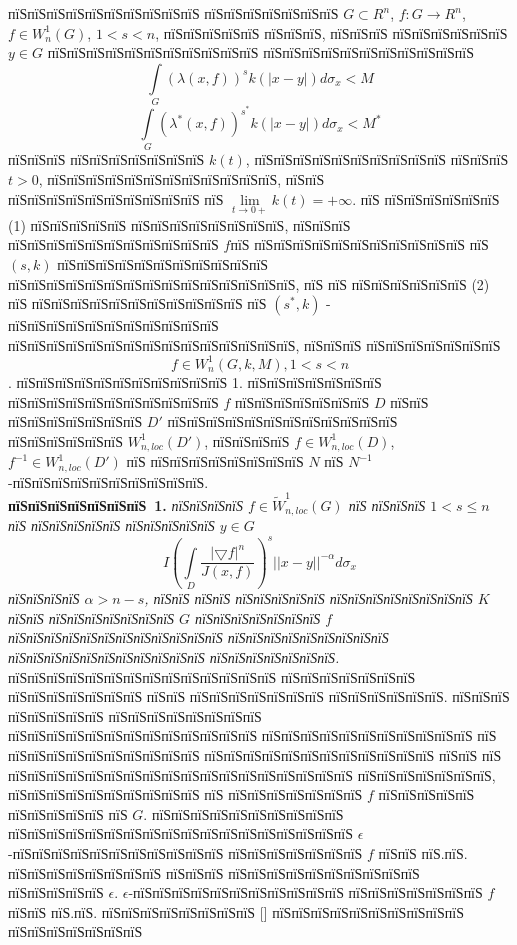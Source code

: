 \documentclass[a5paper, 12pt, openbib]{report}
\begin{document}
пїЅпїЅпїЅпїЅпїЅпїЅпїЅпїЅпїЅпїЅ  пїЅпїЅпїЅпїЅпїЅпїЅпїЅ $G\subset R^n$, $f:G\to R^n$, $f\in W^{1}_{n}(G)$, $1<s<n$, пїЅпїЅпїЅпїЅпїЅ пїЅпїЅпїЅ, пїЅпїЅпїЅ пїЅпїЅпїЅпїЅпїЅпїЅ $y\in G$ пїЅпїЅпїЅпїЅпїЅпїЅпїЅпїЅпїЅпїЅпїЅ пїЅпїЅпїЅпїЅпїЅпїЅпїЅпїЅпїЅпїЅпїЅ
\begin{equation}
\int\limits_{G}(\lambda(x,f))^{s}k(|x-y|)d\sigma_{x}<M
\end{equation} 
\begin{equation}
\int\limits_{G}(\lambda^{*}(x,f))^{s^{*}}k(|x-y|)d\sigma_{x}<M^{*}
\end{equation} 
пїЅпїЅпїЅ пїЅпїЅпїЅпїЅпїЅпїЅпїЅ $k(t)$, пїЅпїЅпїЅпїЅпїЅпїЅпїЅпїЅпїЅпїЅ пїЅпїЅпїЅ $t>0$, пїЅпїЅпїЅпїЅпїЅпїЅпїЅпїЅпїЅпїЅпїЅпїЅ, пїЅпїЅ пїЅпїЅпїЅпїЅпїЅпїЅпїЅпїЅпїЅпїЅ пїЅ $\lim\limits_{t\to 0+}k(t)=+\infty$. пїЅ  пїЅпїЅпїЅпїЅпїЅпїЅ (1) пїЅпїЅпїЅпїЅпїЅ пїЅпїЅпїЅпїЅпїЅпїЅпїЅпїЅ, пїЅпїЅпїЅ пїЅпїЅпїЅпїЅпїЅпїЅпїЅпїЅпїЅпїЅпїЅ $f$пїЅ пїЅпїЅпїЅпїЅпїЅпїЅпїЅпїЅпїЅпїЅпїЅ пїЅ $(s,k)$ пїЅпїЅпїЅпїЅпїЅпїЅпїЅпїЅпїЅпїЅпїЅ пїЅпїЅпїЅпїЅпїЅпїЅпїЅпїЅпїЅпїЅпїЅпїЅпїЅпїЅпїЅ, пїЅ пїЅ пїЅпїЅпїЅпїЅпїЅпїЅ (2) пїЅ пїЅпїЅпїЅпїЅпїЅпїЅпїЅпїЅпїЅпїЅпїЅ пїЅ $(s^{*},k)$ - пїЅпїЅпїЅпїЅпїЅпїЅпїЅпїЅпїЅпїЅпїЅ пїЅпїЅпїЅпїЅпїЅпїЅпїЅпїЅпїЅпїЅпїЅпїЅпїЅпїЅпїЅ, пїЅпїЅпїЅ пїЅпїЅпїЅпїЅпїЅпїЅпїЅ $$f\in W^{1}_{n}(G,k,M), 1<s<n$$.
пїЅпїЅпїЅпїЅпїЅпїЅпїЅпїЅпїЅпїЅпїЅ 1.  пїЅпїЅпїЅпїЅпїЅпїЅпїЅ пїЅпїЅпїЅпїЅпїЅпїЅпїЅпїЅпїЅпїЅпїЅ $f$ пїЅпїЅпїЅпїЅпїЅпїЅпїЅ $D$ пїЅпїЅ пїЅпїЅпїЅпїЅпїЅпїЅпїЅ $D'$ пїЅпїЅпїЅпїЅпїЅпїЅпїЅпїЅпїЅпїЅпїЅпїЅ пїЅпїЅпїЅпїЅпїЅпїЅ $W^{1}_{n,loc}(D')$, пїЅпїЅпїЅпїЅ $f \in W^{1}_{n,loc}(D)$, $f^{-1} \in W^{1}_{n,loc}(D')$   пїЅ пїЅпїЅпїЅпїЅпїЅпїЅпїЅпїЅ $N$ пїЅ $N^{-1}$-пїЅпїЅпїЅпїЅпїЅпїЅпїЅпїЅпїЅпїЅ.\\
\textbf{пїЅпїЅпїЅпїЅпїЅпїЅпїЅ~1.} {\it пїЅпїЅпїЅпїЅ $f\in\widetilde{W}_{n,loc}^1(G) $ пїЅ пїЅпїЅпїЅ $1<s\leq n$ пїЅ пїЅпїЅпїЅпїЅпїЅ пїЅпїЅпїЅпїЅпїЅ $y\in G$ 
\begin{equation}
I\left(
\int\limits_D\frac{|\bigtriangledown f|^{n}}{J(x,f)}
\right)^{s}||x-y||^{-\alpha}d\sigma_{x}
\end{equation}
пїЅпїЅпїЅпїЅ $\alpha>n-s$, пїЅпїЅ пїЅпїЅ пїЅпїЅпїЅпїЅпїЅ пїЅпїЅпїЅпїЅпїЅпїЅпїЅпїЅ $K$ пїЅпїЅ пїЅпїЅпїЅпїЅпїЅпїЅпїЅ $G$ пїЅпїЅпїЅпїЅпїЅпїЅпїЅ  $f$ пїЅпїЅпїЅпїЅпїЅпїЅпїЅпїЅпїЅпїЅпїЅпїЅ пїЅпїЅпїЅпїЅпїЅпїЅпїЅпїЅпїЅ пїЅпїЅпїЅпїЅпїЅпїЅпїЅпїЅпїЅпїЅпїЅ пїЅпїЅпїЅпїЅпїЅпїЅпїЅ.} пїЅпїЅпїЅпїЅпїЅпїЅпїЅпїЅпїЅпїЅпїЅпїЅпїЅпїЅ пїЅпїЅпїЅпїЅпїЅпїЅпїЅ пїЅпїЅпїЅпїЅпїЅпїЅпїЅ пїЅпїЅ пїЅпїЅпїЅпїЅпїЅпїЅпїЅ пїЅпїЅпїЅпїЅпїЅпїЅ. пїЅпїЅпїЅ пїЅпїЅпїЅпїЅпїЅ пїЅпїЅпїЅпїЅпїЅпїЅпїЅпїЅ пїЅпїЅпїЅпїЅпїЅпїЅпїЅпїЅпїЅпїЅпїЅпїЅпїЅ пїЅпїЅпїЅпїЅпїЅпїЅпїЅпїЅпїЅпїЅпїЅ пїЅ пїЅпїЅпїЅпїЅпїЅпїЅпїЅпїЅпїЅпїЅ пїЅпїЅпїЅпїЅпїЅпїЅпїЅпїЅпїЅпїЅпїЅпїЅ пїЅпїЅ $пїЅ$ пїЅпїЅпїЅпїЅпїЅпїЅпїЅпїЅпїЅпїЅпїЅпїЅпїЅпїЅпїЅпїЅпїЅпїЅ пїЅпїЅпїЅпїЅпїЅпїЅпїЅ, пїЅпїЅпїЅпїЅпїЅпїЅпїЅпїЅпїЅпїЅ пїЅ пїЅпїЅпїЅпїЅпїЅпїЅпїЅ $f$  пїЅпїЅпїЅпїЅпїЅ пїЅпїЅпїЅпїЅпїЅ пїЅ $G$. пїЅпїЅпїЅпїЅпїЅпїЅпїЅпїЅпїЅпїЅ пїЅпїЅпїЅпїЅпїЅпїЅпїЅпїЅпїЅпїЅпїЅпїЅпїЅпїЅпїЅпїЅпїЅпїЅ $\epsilon$-пїЅпїЅпїЅпїЅпїЅпїЅпїЅпїЅпїЅпїЅпїЅ пїЅпїЅпїЅпїЅпїЅпїЅпїЅ $f$  пїЅпїЅ пїЅ.пїЅ. пїЅпїЅпїЅпїЅпїЅпїЅпїЅпїЅ пїЅпїЅпїЅ пїЅпїЅпїЅпїЅпїЅпїЅпїЅпїЅпїЅпїЅ пїЅпїЅпїЅпїЅпїЅ $\epsilon$. $\epsilon$-пїЅпїЅпїЅпїЅпїЅпїЅпїЅпїЅпїЅпїЅпїЅ пїЅпїЅпїЅпїЅпїЅпїЅпїЅ $f$ пїЅпїЅ пїЅ.пїЅ. пїЅпїЅпїЅпїЅпїЅпїЅпїЅпїЅ [] пїЅпїЅпїЅпїЅпїЅпїЅпїЅпїЅпїЅпїЅ пїЅпїЅпїЅпїЅпїЅпїЅпїЅ 
\end{document}
